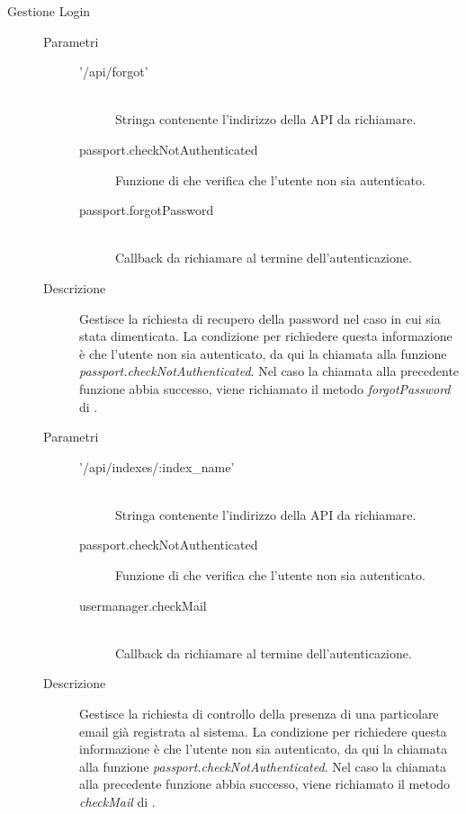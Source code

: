 \begin{description}
\begin{description}
 \item[Gestione Login]
 \begin{mldescription}
   \begin{description}
      \item[Parametri] \hfill
       \begin{description}
        \item['/api/forgot'] \hfill \\
        Stringa contenente l'indirizzo della API da richiamare.
        \item[passport.checkNotAuthenticated]
        Funzione di  che verifica che l'utente non sia autenticato.
        \item[passport.forgotPassword] \hfill \\
        Callback da richiamare al termine dell'autenticazione.
       \end{description}
      \item[Descrizione]
      Gestisce la richiesta di recupero della password nel caso in cui sia stata dimenticata. La condizione per richiedere questa informazione è che l'utente non sia autenticato, da qui la chiamata alla funzione \textit{passport.checkNotAuthenticated}. Nel caso la chiamata alla precedente funzione abbia successo, viene richiamato il metodo \textit{forgotPassword} di .
   \end{description}
   
 \begin{description}
    \item[Parametri] \hfill
     \begin{description}
      \item['/api/indexes/:index\_name'] \hfill \\
      Stringa contenente l'indirizzo della API da richiamare.
      \item[passport.checkNotAuthenticated]
      Funzione di  che verifica che l'utente non sia autenticato.
      \item[usermanager.checkMail] \hfill \\
      Callback da richiamare al termine dell'autenticazione.
     \end{description}
    \item[Descrizione]
    Gestisce la richiesta di controllo della presenza di una particolare email già registrata al sistema. La condizione per richiedere questa informazione è che l'utente non sia autenticato, da qui la chiamata alla funzione \textit{passport.checkNotAuthenticated}. Nel caso la chiamata alla precedente funzione abbia successo, viene richiamato il metodo \textit{checkMail} di .
 \end{description}
 

\end{mldescription}
\end{description}
\end{description}
